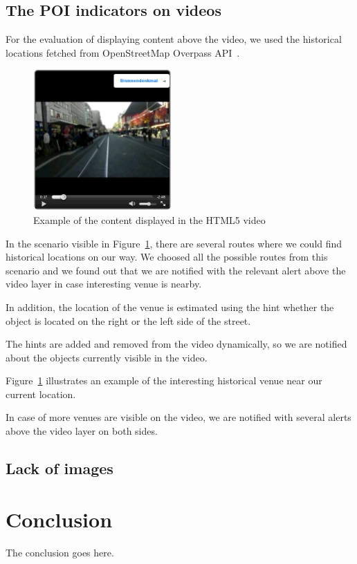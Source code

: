 \documentclass[journal]{IEEEtran}
\begin{document}
\subsection{The POI indicators on videos}

For the evaluation of displaying content above the video, we used the historical locations fetched from OpenStreetMap Overpass API~\cite{overpass}.

	   \begin{figure}[htb]
         \centering
         \includegraphics[width=200px]{video_with_info}
         \caption{Example of the content displayed in the HTML5 video}
         \label{video_with_info}
        \end{figure}

	In the scenario visible in Figure~\ref{video_with_info}, there are several routes where we could find historical locations on our way. We choosed all the possible routes from this scenario and we found out that we are notified with the relevant alert above the video layer in case interesting venue is nearby.

	In addition, the location of the venue is estimated using the hint whether the object is located on the right or the left side of the street.
	
	The hints are added and removed from the video dynamically, so we are notified about the objects currently visible in the video.
	
	Figure~\ref{video_with_info} illustrates an example of the interesting historical venue near our current location.

	In case of more venues are visible on the video, we are notified with several alerts above the video layer on both sides.

\subsection{Lack of images}


\section{Conclusion}
The conclusion goes here.
\end{document}
